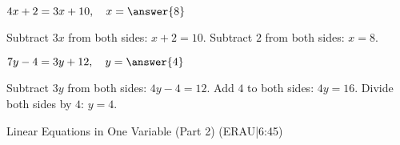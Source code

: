 \documentclass{ximera}
\begin{document}
\begin{problem}
$4x + 2 = 3x + 10,\quad x = \answer{8}$
\begin{feedback}
Subtract $3x$ from both sides: $x + 2 = 10$. Subtract $2$ from both sides: $x = 8$.
\end{feedback}
\end{problem}

\begin{problem}
$7y - 4 = 3y + 12,\quad y = \answer{4}$
\begin{feedback}
Subtract $3y$ from both sides: $4y - 4 = 12$. Add $4$ to both sides: $4y = 16$. Divide both sides by $4$: $y = 4$.
\end{feedback}
\end{problem}


Linear Equations in One Variable (Part 2) (ERAU|6:45)

\end{document}
